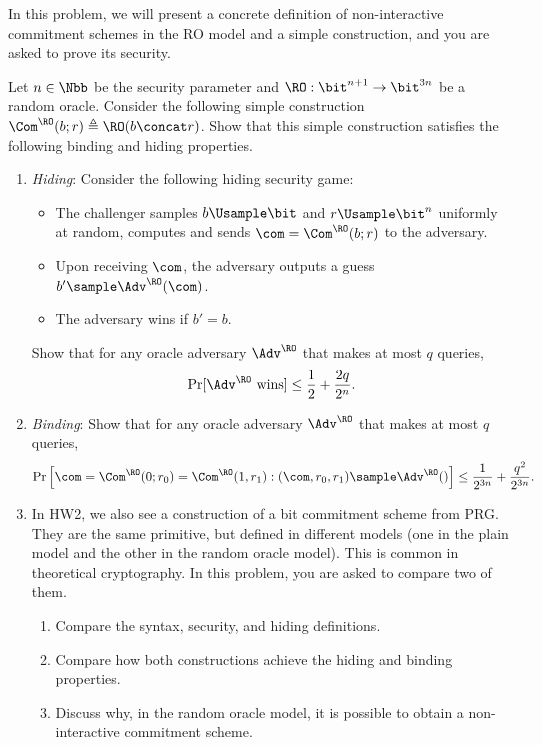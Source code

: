 \begin{problem}\label{p3}
    \leavevmode\par
    In this problem, we will present a concrete definition of non-interactive commitment schemes in the RO model and a simple construction, and you are asked to prove its security.

    Let $n\in\Nbb$ be the security parameter and $\RO:\bit^{n+1}\to \bit^{3n}$ be a random oracle. 
    Consider the following simple construction $\Com^{\RO}(b;r)\triangleq \RO(b\concat r)$. Show that this simple construction satisfies the following binding and hiding properties.
    \begin{enumerate}[label=(\roman*)]
        \item \textit{Hiding}: Consider the following hiding security game:
        \begin{itemize}
            \item The challenger samples $b\Usample\bit$ and $r\Usample\bit^n$ uniformly at random, computes and sends $\com = \Com^{\RO}(b;r)$ to the adversary.
            \item Upon receiving $\com$, the adversary outputs a guess $b' \sample \Adv^{\RO}(\com)$.
            \item The adversary wins if $b'=b$.
        \end{itemize}
        Show that for any oracle adversary $\Adv^{\RO}$ that makes at most $q$ queries,
        \[
            \Pr[\Adv^{\RO} \textrm{ wins}] \le \frac{1}{2}+\frac{2q}{2^n}.
        \]
        \item \textit{Binding}: Show that for any oracle adversary $\Adv^{\RO}$ that makes at most $q$ queries,
        \[
            \Pr\left[\com=\Com^\RO(0; r_0)=\Com^\RO(1, r_1) : (\com, r_0, r_1)\sample \Adv^\RO() \right] \le \frac{1}{2^{3n}}+ \frac{q^2}{2^{3n}}.
        \]
        \item In HW2, we also see a construction of a bit commitment scheme from PRG. They are the same primitive, but defined in different models (one in the plain model and the other in the random oracle model). This is common in theoretical cryptography. In this problem, you are asked to compare two of them.
        \begin{enumerate}[label=(\alph*)]
            \item Compare the syntax, security, and hiding definitions.
            \item Compare how both constructions achieve the hiding and binding properties.
            \item Discuss why, in the random oracle model, it is possible to obtain a non-interactive
commitment scheme.
        \end{enumerate}
    \end{enumerate}
\end{problem}



